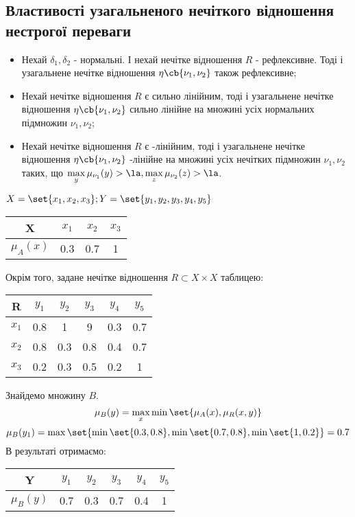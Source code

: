 \subsection{Властивості узагальненого нечіткого відношення нестрогої переваги}
\begin{itemize}
\item Нехай $\delta_1,\delta_2$ - нормальні. І нехай нечітке відношення $R$ - рефлексивне. Тоді і узагальнене нечітке відношення $\eta\cb{\nu_1,\nu_2}$ також рефлексивне;
\item Нехай нечітке відношення $R$ є сильно лінійним, тоді і узагальнене нечітке відношення $\eta\cb{\nu_1,\nu_2}$ сильно лінійне на множині усіх нормальних підмножин $\nu_1,\nu_2$;
\item Нехай нечітке відношення $R$ є \la-лінійним, тоді і узагальнене нечітке відношення $\eta\cb{\nu_1,\nu_2}$ \la-лінійне на множині усіх нечітких підмножин $\nu_1,\nu_2$ таких, що $\max\limits_y\mu_{\nu_1}(y)>\la,\max\limits_z\mu_{\nu_2}(z)>\la$.
\end{itemize}
\begin{exs}
$X=\set{x_1,x_2,x_3};Y=\set{y_1,y_2,y_3,y_4,y_5}$\\
\begin{center}
\begin{tabular}{|c|c|c|c|}
\hline	
X & $x_1$ & $x_2$ & $x_3$\\
\hline
$\mu_A(x)$ & 0.3 & 0.7 & 1 \\
\hline
\end{tabular}
\end{center}
Окрім того, задане нечітке відношення $R\subset X\times X$ таблицею:\\
\begin{center}
\begin{tabular}{|c|c|c|c|c|c|}
\hline
R & $y_1$ & $y_2$ & $y_3$ & $y_4$ & $y_5$\\
\hline
$x_1$ & 0.8 & 1 & 9 & 0.3 & 0.7 \\
\hline
$x_2$ & 0.8 & 0.3 & 0.8 & 0.4 & 0.7\\
\hline
$x_3$ & 0.2 & 0.3 & 0.5 & 0.2 & 1\\
\hline
\end{tabular}
\end{center}
Знайдемо множину $B$.
\begin{equation*}
\mu_B(y) = \max\limits_x \min\set{\mu_A(x),\mu_R(x,y)}
\end{equation*}
\begin{equation*}
\mu_B(y_1) = \max\set{\min\set{0.3,0.8},\min\set{0.7,0.8},\min\set{1,0.2}} = 0.7
\end{equation*}
В результаті отримаємо:\\
\begin{center}
\begin{tabular}{|c|c|c|c|c|c|}
\hline
Y & $y_1$ & $y_2$ & $y_3$ & $y_4$ & $y_5$\\
\hline
$\mu_B(y)$ & 0.7 & 0.3 & 0.7 & 0.4 & 1 \\
\hline 
\end{tabular}
\end{center}
\end{exs}
